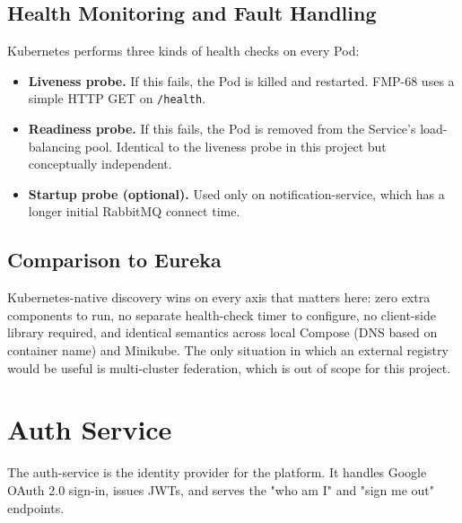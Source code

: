 \documentclass[11pt,a4paper]{article}
\begin{document}
\subsection{Health Monitoring and Fault Handling}
Kubernetes performs three kinds of health checks on every Pod:

\begin{itemize}[leftmargin=*]
  \item \textbf{Liveness probe.}  If this fails, the Pod is killed
        and restarted.  FMP-68 uses a simple HTTP GET on
        \texttt{/health}.
  \item \textbf{Readiness probe.}  If this fails, the Pod is removed
        from the Service's load-balancing pool.  Identical to the
        liveness probe in this project but conceptually independent.
  \item \textbf{Startup probe (optional).}  Used only on
        notification-service, which has a longer initial RabbitMQ
        connect time.
\end{itemize}

\subsection{Comparison to Eureka}
Kubernetes-native discovery wins on every axis that matters here:
zero extra components to run, no separate health-check timer to
configure, no client-side library required, and identical semantics
across local Compose (DNS based on container name) and Minikube.
The only situation in which an external registry would be useful is
multi-cluster federation, which is out of scope for this project.

\section{Auth Service}

The auth-service is the identity provider for the platform.  It
handles Google OAuth 2.0 sign-in, issues JWTs, and serves the
"who am I" and "sign me out" endpoints.
\end{document}
